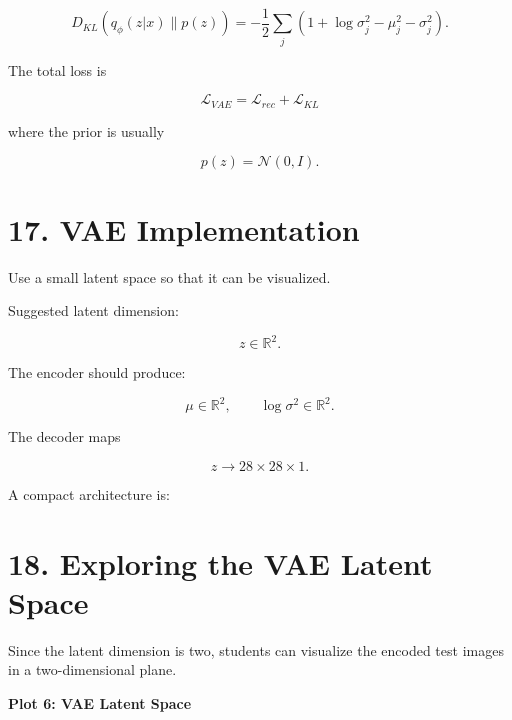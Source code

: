 \documentclass[10pt]{article}
\begin{document}
\[
D_{KL}
\left(
q_{\phi}(z|x)\parallel p(z)
\right)
=
-\frac{1}{2}
\sum_j
\left(
1+\log\sigma_j^2-\mu_j^2-\sigma_j^2
\right).
\]

The total loss is

\[
\boxed{
\mathcal{L}_{VAE}
=
\mathcal{L}_{rec}
+
\mathcal{L}_{KL}
}
\]

where the prior is usually

\[
p(z)=\mathcal{N}(0,I).
\]

\section*{17. VAE Implementation}

Use a small latent space so that it can be visualized.

Suggested latent dimension:

\[
z\in\mathbb{R}^{2}.
\]

The encoder should produce:

\[
\mu\in\mathbb{R}^{2},
\qquad
\log\sigma^2\in\mathbb{R}^{2}.
\]

The decoder maps

\[
z\rightarrow28\times28\times1.
\]

A compact architecture is:

\begin{center}
\end{center}

\section*{18. Exploring the VAE Latent Space}

Since the latent dimension is two, students can visualize the encoded test
images in a two-dimensional plane.

\textbf{Plot 6: VAE Latent Space}
\end{document}
